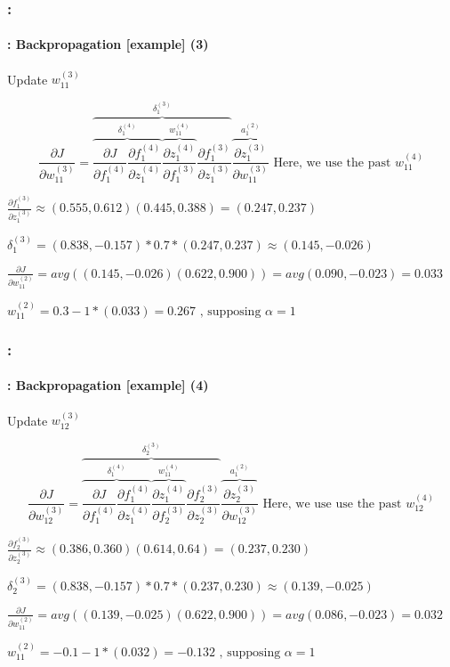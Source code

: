 \documentclass[xcolor=table]{beamer}
\begin{document}
\begin{frame}
	\frametitle{\insertshortsubtitle: \insertsection}
	\framesubtitle{\insertsubsection: Backpropagation [example] (3)}
	
	Update $w_{11}^{(3)}$
	
	\small
	
	\[
	\frac{\partial J}{\partial w_{11}^{(3)}} = 
	\overbrace{
		\overbrace{
			\frac{\partial J}{\partial f_{1}^{(4)}} 
			\frac{\partial f_{1}^{(4)}}{\partial z_{1}^{(4)}}
		}^{\delta_{1}^{(4)}} 
		\overbrace{
			\frac{\partial z_{1}^{(4)}}{\partial f_{1}^{(3)}}
		}^{w_{11}^{(4)}} 
		\frac{\partial f_{1}^{(3)}}{\partial z_{1}^{(3)}} 
	}^{\delta_{1}^{(3)}} 
	\overbrace{
		\frac{\partial z_{1}^{(3)}}{\partial w_{11}^{(3)}}
	}^{a_{1}^{(2)}}
	\text{ Here, we use the past } w_{11}^{(4)}
	\]
	
	$
	\frac{\partial f_{1}^{(3)}}{\partial z_{1}^{(3)}} \approx 
	(0.555, 0.612) (0.445, 0.388) = (0.247, 0.237)
	$
	
	$
	\delta_{1}^{(3)} = (0.838, -0.157) * 0.7 * (0.247, 0.237) \approx (0.145, -0.026)
	$
	
	$
	\frac{\partial J}{\partial w_{11}^{(2)}} = avg((0.145, -0.026) (0.622, 0.900)) 
	= avg(0.090, -0.023) = 0.033
	$
	
	$
	w_{11}^{(2)} = 0.3 - 1 * (0.033) = 0.267 \text{ , supposing } \alpha = 1
	$

\end{frame}


\begin{frame}
	\frametitle{\insertshortsubtitle: \insertsection}
	\framesubtitle{\insertsubsection: Backpropagation [example] (4)}
	
	Update $w_{12}^{(3)}$
	
	\small
	
	\[
	\frac{\partial J}{\partial w_{12}^{(3)}} = 
	\overbrace{
		\overbrace{
			\frac{\partial J}{\partial f_{1}^{(4)}} 
			\frac{\partial f_{1}^{(4)}}{\partial z_{1}^{(4)}}
		}^{\delta_{1}^{(4)}} 
		\overbrace{
			\frac{\partial z_{1}^{(4)}}{\partial f_{2}^{(3)}}
		}^{w_{11}^{(4)}} 
		\frac{\partial f_{2}^{(3)}}{\partial z_{2}^{(3)}} 
	}^{\delta_{2}^{(3)}} 
	\overbrace{
		\frac{\partial z_{2}^{(3)}}{\partial w_{12}^{(3)}}
	}^{a_{1}^{(2)}}
	\text{ Here, we use use the past } w_{12}^{(4)}
	\]
	
	$
	\frac{\partial f_{2}^{(3)}}{\partial z_{2}^{(3)}} \approx 
	(0.386, 0.360) (0.614, 0.64) = (0.237, 0.230)
	$
	
	$
	\delta_{2}^{(3)} = (0.838, -0.157) * 0.7 * (0.237, 0.230) \approx (0.139, -0.025)
	$
	
	$
	\frac{\partial J}{\partial w_{11}^{(2)}} = avg((0.139, -0.025) (0.622, 0.900)) 
	= avg(0.086, -0.023) = 0.032
	$
	
	$
	w_{11}^{(2)} = - 0.1 - 1 * (0.032) = - 0.132 \text{ , supposing } \alpha = 1
	$

\end{frame}
\end{document}
